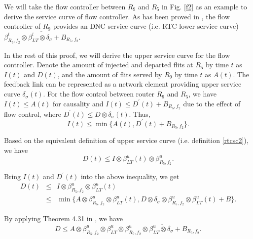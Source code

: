 \documentclass[preprint]{elsarticle}
\begin{document}
\begin{pf}
We will take the flow controller between $R_9$ and $R_5$ in Fig. \ref{f2} as an example to derive the service curve of flow controller. As has been proved in \cite{qian2009analysis}, the flow controller of $R_9$ provides an DNC service curve (i.e. RTC lower service curve) $\overline{\beta^l_{R_5,f_2}\otimes\beta_{LT}^l\otimes\delta_{\sigma}+B_{R_5,f_2}}$. 

In the rest of this proof, we will derive the upper service curve for the flow controller. Denote the amount of injected and departed flits at $R_5$ by time $t$ as $I(t)$ and $D(t)$, and the amount of flits served by $R_9$ by time $t$ as $A(t)$. The feedback link can be represented as a network element providing upper service curve $\delta_\sigma(t)$. For the flow control between router $R_9$ and $R_5$, we have $I(t)\leq A(t)$ for causality and $I(t)\leq D^\prime(t)+B_{R_5,f_2}$ due to the effect of flow control, where $D^\prime(t)\leq D\otimes\delta_\sigma(t)$. Thus, $$I(t)\leq\min\{A(t),D^\prime(t)+B_{R_5,f_2}\}.$$

Based on the equivalent definition of upper service curve (i.e. definition \ref{rtcsc2}), we have $$D(t)\leq I\otimes \beta_{LT}^u(t)\otimes\beta_{R_5,f_2}^u.$$

Bring $I(t)$ and $D^\prime(t)$ into the above inequality, we get
\begin{eqnarray*}
D(t)&\leq& I\otimes \beta_{R_5,f_2}^u\otimes\beta_{LT}^u(t)\\
&\leq& \min\{A\otimes \beta^u_{R_5,f_2}\otimes\beta_{LT}^u(t),D\otimes\delta_\sigma\otimes \beta_{R_5,f_2}^u\otimes\beta_{LT}^u(t)+B\}.
\end{eqnarray*}

By applying Theorem 4.31 in \cite{Boudec2001Network}, we have
$$D\leq A\otimes \beta^u_{R_5,f_2}\otimes\beta_{LT}^u\otimes\overline{\beta_{R_5,f_2}^u\otimes\beta_{LT}^u\otimes\delta_\sigma+B_{R_5,f_2}}.$$


\end{pf}
\end{document}
